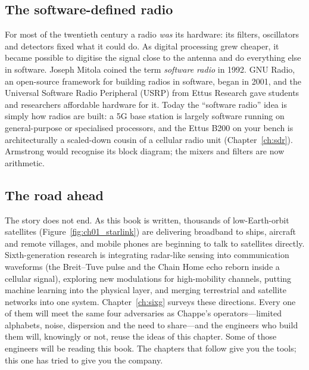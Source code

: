 \subsection{The software-defined radio}

For most of the twentieth century a radio \emph{was} its hardware: its filters, oscillators and detectors
fixed what it could do. As digital processing grew cheaper, it became possible to digitise the signal
close to the antenna and do everything else in software. Joseph Mitola coined the term \emph{software
radio} in 1992. GNU Radio, an open-source framework for building radios in software, began in 2001, and
the Universal Software Radio Peripheral (USRP) from Ettus Research gave students and researchers
affordable hardware for it. Today the ``software radio'' idea is simply how radios are built: a 5G base
station is largely software running on general-purpose or specialised processors, and the Ettus B200 on
your bench is architecturally a scaled-down cousin of a cellular radio unit (Chapter~\ref{ch:sdr}).
Armstrong would recognise its block diagram; the mixers and filters are now arithmetic.

\subsection{The road ahead}

The story does not end. As this book is written, thousands of low-Earth-orbit satellites
(Figure~\ref{fig:ch01_starlink}) are delivering broadband to ships, aircraft and remote villages, and
mobile phones are beginning to talk to satellites directly. Sixth-generation research is integrating
radar-like sensing into communication waveforms (the Breit--Tuve pulse and the Chain Home echo reborn
inside a cellular signal), exploring new modulations for high-mobility channels, putting machine
learning into the physical layer, and merging terrestrial and satellite networks into one system.
Chapter~\ref{ch:sixg} surveys these directions. Every one of them will meet the same four adversaries
as Chappe's operators---limited alphabets, noise, dispersion and the need to share---and the engineers
who build them will, knowingly or not, reuse the ideas of this chapter. Some of those engineers will
be reading this book. The chapters that follow give you the tools; this one has tried to give you the
company.

